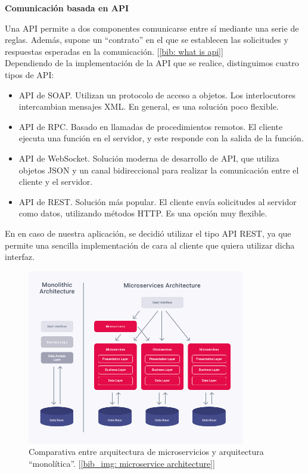 \documentclass[a4paper, oneside, 12pt]{book}
\begin{document}
	\pagebreak
	
	\noindent \textbf{\large Comunicación basada en \textbf{API}} \\
	\label{sec: api}
	
	\noindent Una API permite a dos componentes comunicarse entre sí mediante una serie de reglas. Además, supone un ``contrato'' en el que se establecen las solicitudes y respuestas esperadas en la comunicación. [\ref{bib: what is api}] \\
	
	\noindent Dependiendo de la implementación de la API que se realice, distinguimos cuatro tipos de API:
	
	\begin{itemize}
		\item API de SOAP. Utilizan un protocolo de acceso a objetos. Los interlocutores intercambian mensajes XML. En general, es una solución poco flexible.
		
		\item API de RPC. Basado en llamadas de procedimientos remotos. El cliente ejecuta una función en el servidor, y este responde con la salida de la función.
		
		\item API de WebSocket. Solución moderna de desarrollo de API, que utiliza objetos JSON y un canal bidireccional para realizar la comunicación entre el cliente y el servidor.
		
		\item API de REST. Solución más popular. El cliente envía solicitudes al servidor como datos, utilizando métodos HTTP. Es una opción muy flexible.
	\end{itemize}
	
	\noindent En en caso de nuestra aplicación, se decidió utilizar el tipo API REST, ya que permite una sencilla implementación de cara al cliente que quiera utilizar dicha interfaz.
	
	\begin{figure}[h!]
		\begin{center}
			\includegraphics[width=0.85\textwidth]{img/microservice_architecture.png}
			\caption{Comparativa entre arquitectura de microservicios y arquitectura ``monolítica''. [\ref{bib_img: microservice architecture}]}
			\label{img: microservice architecture}
		\end{center}
	\end{figure}
	
\end{document}
